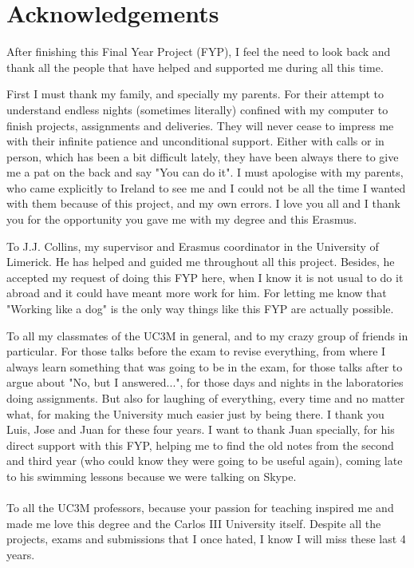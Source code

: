 \section*{Acknowledgements}
\label{cheers}
After finishing this Final Year Project (FYP), I feel the need to look back and thank all the people that have helped and supported me during all this time. 

First I must thank my family, and specially my parents. For their attempt to understand endless nights (sometimes literally) confined with my computer to finish projects, assignments and deliveries. They will never cease to impress me with their infinite patience and unconditional support. Either with calls or in person, which has been a bit difficult lately, they have been always there to give me a pat on the back and say "You can do it". I must apologise with my parents, who came explicitly to Ireland to see me and I could not be all the time I wanted with them because of this project, and my own errors. I love you all and I thank you for the opportunity you gave me with my degree and this Erasmus.

To J.J. Collins, my supervisor and Erasmus coordinator in the University of Limerick. He has helped and guided me throughout all this project. Besides, he accepted my request of doing this FYP here, when I know it is not usual to do it abroad and it could have meant more work for him. For letting me know that "Working like a dog" is the only way things like this FYP are actually possible.

To all my classmates of the UC3M in general, and to my crazy group of friends in particular. For those talks before the exam to revise everything, from where I always learn something that was going to be in the exam, for those talks after to argue about "No, but I answered...", for those days and nights in the laboratories doing assignments. But also for laughing of everything, every time and no matter what, for making the University much easier just by being there. I thank you Luis, Jose and Juan for these four years. I want to thank Juan specially, for his direct support with this FYP, helping me to find the old notes from the second and third year (who could know they were going to be useful again), coming late to his swimming lessons because we were talking on Skype. \\
\\
To all the UC3M professors, because your passion for teaching inspired me and made me love this degree and the Carlos III University itself. Despite all the projects, exams and submissions that I once hated, I know I will miss these last 4 years.


